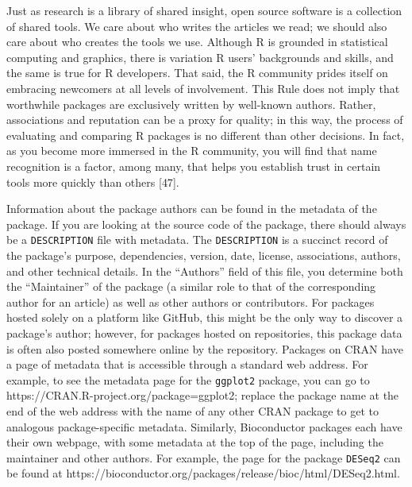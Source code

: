 \documentclass[10pt,letterpaper]{article}
\begin{document}
Just as research is a library of shared insight, open source software is
a collection of shared tools. We care about who writes the articles we
read; we should also care about who creates the tools we use. Although R
is grounded in statistical computing and graphics, there is variation R
users' backgrounds and skills, and the same is true for R developers.
That said, the R community prides itself on embracing newcomers at all
levels of involvement. This Rule does not imply that worthwhile packages
are exclusively written by well-known authors. Rather, associations and
reputation can be a proxy for quality; in this way, the process of
evaluating and comparing R packages is no different than other
decisions. In fact, as you become more immersed in the R community, you
will find that name recognition is a factor, among many, that helps you
establish trust in certain tools more quickly than others {[}47{]}.

Information about the package authors can be found in the metadata of
the package. If you are looking at the source code of the package, there
should always be a \texttt{DESCRIPTION} file with metadata. The
\texttt{DESCRIPTION} is a succinct record of the package's purpose,
dependencies, version, date, license, associations, authors, and other
technical details. In the ``Authors'' field of this file, you determine
both the ``Maintainer'' of the package (a similar role to that of the
corresponding author for an article) as well as other authors or
contributors. For packages hosted solely on a platform like GitHub, this
might be the only way to discover a package's author; however, for
packages hosted on repositories, this package data is often also posted
somewhere online by the repository. Packages on CRAN have a page of
metadata that is accessible through a standard web address. For example,
to see the metadata page for the \texttt{ggplot2} package, you can go to
https://CRAN.R-project.org/package=ggplot2; replace the package name at
the end of the web address with the name of any other CRAN package to
get to analogous package-specific metadata. Similarly, Bioconductor
packages each have their own webpage, with some metadata at the top of
the page, including the maintainer and other authors. For example, the
page for the package \texttt{DESeq2} can be found at
https://bioconductor.org/packages/release/bioc/html/DESeq2.html.
\end{document}
